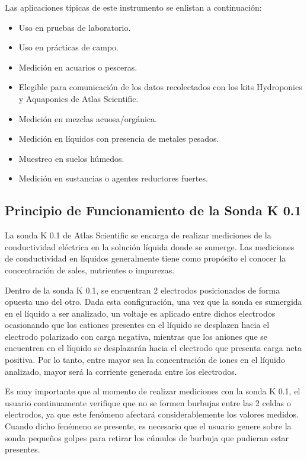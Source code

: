 Las aplicaciones típicas de este instrumento se enlistan a continuación:

\begin{itemize}
    \item Uso en pruebas de laboratorio.
    \item Uso en prácticas de campo.
    \item Medición en acuarios o pesceras.
    \item Elegible para comunicación de los datos recolectados con los kits Hydroponics y Aquaponics de Atlas Scientific.
    \item Medición en mezclas acuosa/orgánica.
    \item Medición en líquidos con presencia de metales pesados.
    \item Muestreo en suelos húmedos.
    \item Medición en sustancias o agentes reductores fuertes.
\end{itemize}

\subsection{Principio de Funcionamiento de la Sonda K 0.1}

La sonda K 0.1 de Atlas Scientific se encarga de realizar mediciones de la conductividad eléctrica en la solución líquida donde se sumerge. Las mediciones de conductividad en líquidos generalmente tiene como propósito el conocer 
la concentración de sales, nutrientes o impurezas.

Dentro de la sonda K 0.1, se encuentran 2 electrodos posicionados de forma opuesta uno del otro. Dada esta configuración, una vez que la sonda es sumergida en el líquido a ser analizado, un voltaje es aplicado entre dichos 
electrodos ocasionando que los cationes presentes en el líquido se desplazen hacia el electrodo polarizado con carga negativa, mientras que los aniones que se encuentren en el líquido se desplazarán hacia el electrodo que presenta
carga neta positiva. Por lo tanto, entre mayor sea la concentración de iones en el líquido analizado, mayor será la corriente generada entre los electrodos.

Es muy importante que al momento de realizar mediciones con la sonda K 0.1, el usuario continuamente verifique que no se formen burbujas entre las 2 celdas o electrodos, ya que este fenómeno afectará considerablemente los valores 
medidos. Cuando dicho fenémeno se presente, es necesario que el usuario genere sobre la sonda pequeños golpes para retirar los cúmulos de burbuja que pudieran estar presentes.


